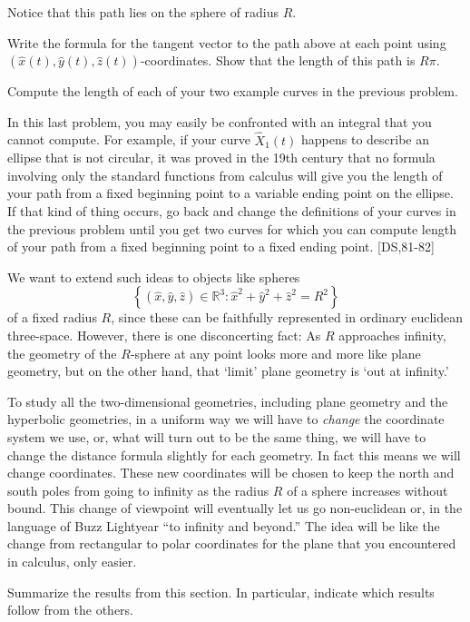 \documentclass{ximera}
\begin{document}
Notice that this path lies on the sphere of radius $R$.

\begin{problem}
Write the formula for the tangent vector to the path above at each
point using
$\left(\hat{x}(t),\hat{y}(t),\hat{z}(t)\right)$-coordinates. Show that
the length of this path is $R\pi$.
\end{problem}

\begin{problem}
Compute the length of each of your two example curves in the previous
problem.
\end{problem}

\begin{remark}
In this last problem, you may easily be confronted with an integral
that you cannot compute. For example, if your curve $\hat{X}_{1}\left(
t\right) $ happens to describe an ellipse that is not circular, it was
proved in the 19th century that no formula involving only the
standard functions from calculus will give you the length of your path
from a fixed beginning point to a variable ending point on the
ellipse. If that kind of thing occurs, go back and change the
definitions of your curves in the previous problem until you get two
curves for which you can compute length of your path from a fixed
beginning point to a fixed ending point. [DS,81-82]
\end{remark}




We want to extend such ideas to objects like spheres
\[
\left\{  \left(  \hat{x},\hat{y},\hat{z}\right)  \in\mathbb{R}^{3}:\hat{x}%
^{2}+\hat{y}^{2}+\hat{z}^{2}=R^{2}\right\}
\]
of a fixed radius $R$, since these can be faithfully represented in
ordinary euclidean three-space.  However, there is one disconcerting
fact: As $R$ approaches infinity, the geometry of the $R$-sphere at
any point looks more and more like plane geometry, but on the other
hand, that `limit' plane geometry is `out at infinity.' 

To study all the two-dimensional geometries, including plane geometry
and the hyperbolic geometries, in a uniform way we will have to
\textit{change} the coordinate system we use, or, what will turn out
to be the same thing, we will have to change the distance formula
slightly for each geometry. In fact this means we will change
coordinates.  These new coordinates will be chosen to keep the north
and south poles from going to infinity as the radius $R$ of a sphere
increases without bound. This change of viewpoint will eventually let
us go non-euclidean or, in the language of Buzz Lightyear ``to
infinity and beyond.'' The idea will be like the change from
rectangular to polar coordinates for the plane that you encountered in
calculus, only easier.


\begin{problem}
Summarize the results from this section. In particular, indicate which
results follow from the others.
\begin{freeResponse}
\end{freeResponse}
\end{problem}
\end{document}
